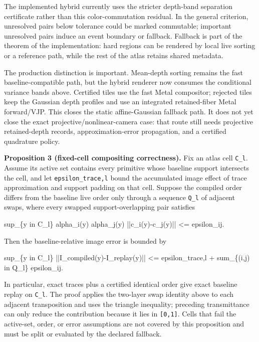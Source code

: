 \documentclass[
]{article}
\newenvironment{Shaded}{}{}
\newcommand{\NormalTok}[1]{#1}
\begin{document}
The implemented hybrid currently uses the stricter depth-band separation
certificate rather than this color-commutation residual. In the general
criterion, unresolved pairs below tolerance could be marked commutable;
important unresolved pairs induce an event boundary or fallback.
Fallback is part of the theorem of the implementation: hard regions can
be rendered by local live sorting or a reference path, while the rest of
the atlas retains shared metadata.

The production distinction is important. Mean-depth sorting remains the
fast baseline-compatible path, but the hybrid renderer now consumes the
conditional variance bands above. Certified tiles use the fast Metal
compositor; rejected tiles keep the Gaussian depth profiles and use an
integrated retained-fiber Metal forward/VJP. This closes the static
affine-Gaussian fallback path. It does not yet close the exact
projective/nonlinear-camera case: that route still needs projective
retained-depth records, approximation-error propagation, and a certified
quadrature policy.

\textbf{Proposition 3 (fixed-cell compositing correctness).} Fix an
atlas cell \texttt{C\_l}. Assume its active set contains every primitive
whose baseline support intersects the cell, and let
\texttt{epsilon\_trace,l} bound the accumulated image effect of trace
approximation and support padding on that cell. Suppose the compiled
order differs from the baseline live order only through a sequence
\texttt{Q\_l} of adjacent swaps, where every swapped support-overlapping
pair satisfies

\begin{Shaded}
\begin{Highlighting}[]
\NormalTok{sup\_\{y in C\_l\}}
\NormalTok{  alpha\_i(y) alpha\_j(y) ||c\_i(y){-}c\_j(y)|| \textless{}= epsilon\_ij.}
\end{Highlighting}
\end{Shaded}

Then the baseline-relative image error is bounded by

\begin{Shaded}
\begin{Highlighting}[]
\NormalTok{sup\_\{y in C\_l\} ||I\_compiled(y){-}I\_replay(y)||}
\NormalTok{  \textless{}= epsilon\_trace,l + sum\_\{(i,j) in Q\_l\} epsilon\_ij.}
\end{Highlighting}
\end{Shaded}

In particular, exact traces plus a certified identical order give exact
baseline replay on \texttt{C\_l}. The proof applies the two-layer swap
identity above to each adjacent transposition and uses the triangle
inequality; preceding transmittance can only reduce the contribution
because it lies in \texttt{{[}0,1{]}}. Cells that fail the active-set,
order, or error assumptions are not covered by this proposition and must
be split or evaluated by the declared fallback.
\end{document}

